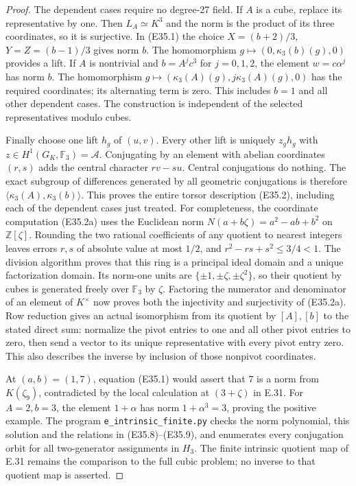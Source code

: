 \begin{proof}
The dependent cases require no degree-27 field.
If $A$ is a cube, replace its representative by one.
Then $L_A\simeq K^3$ and the norm is the product of its
three coordinates, so it is surjective. In (E35.1) the
choice
$X=(b+2)/3$, $Y=Z=(b-1)/3$ gives norm $b$.
The homomorphism $g\mapsto(0,\kappa_3(b)(g),0)$
provides a lift.
If $A$ is nontrivial and $b=A^j c^3$ for $j=0,1,2$,
the element $w=c\alpha^j$ has norm $b$.
The homomorphism
$g\mapsto(\kappa_3(A)(g),j\kappa_3(A)(g),0)$
has the required coordinates; its alternating term is
zero. This includes $b=1$ and all other dependent
cases. The construction is independent of the selected
representatives modulo cubes.

Finally choose one lift $h_g$ of $(u,v)$.
Every other lift is uniquely $z_g h_g$ with
$z\in H^1(G_K,\mathbb F_3)=\mathcal A$.
Conjugating by an element with abelian coordinates
$(r,s)$ adds the central character
$r v-s u$. Central conjugations do nothing.
The exact subgroup of differences generated by all
geometric conjugations is therefore
$\langle\kappa_3(A),\kappa_3(b)\rangle$.
This proves the entire torsor description (E35.2),
including each of the dependent cases just treated.
For completeness, the coordinate computation (E35.2a)
uses the Euclidean norm
$N(a+b\zeta)=a^2-ab+b^2$ on $\mathbb Z[\zeta]$.
Rounding the two rational coefficients of any quotient
to nearest integers leaves errors $r,s$ of absolute
value at most $1/2$, and
$r^2-rs+s^2\leq3/4<1$. The division algorithm proves
that this ring is a principal ideal domain and a unique
factorization domain. Its norm-one units are
$\{\pm1,\pm\zeta,\pm\zeta^2\}$, so their quotient by
cubes is generated freely over $\mathbb F_3$ by $\zeta$.
Factoring the numerator and denominator of an element
of $K^\times$ now proves both the injectivity and
surjectivity of (E35.2a). Row reduction gives an actual
isomorphism from its quotient by $[A],[b]$ to the stated
direct sum: normalize the pivot entries to one and all
other pivot entries to zero, then send a vector to its
unique representative with every pivot entry zero.
This also describes the inverse by inclusion of those
nonpivot coordinates.

At $(a,b)=(1,7)$, equation (E35.1) would assert that
$7$ is a norm from $K(\zeta_9)$, contradicted by the
local calculation at $(3+\zeta)$ in E.31.
For $A=2,b=3$, the element $1+\alpha$ has norm
$1+\alpha^3=3$, proving the positive example.
The program \texttt{e\_intrinsic\_finite.py} checks the
norm polynomial, this solution and the relations in
(E35.8)--(E35.9), and enumerates every conjugation
orbit for all two-generator assignments in $H_3$.
The finite intrinsic quotient map of E.31 remains the
comparison to the full cubic problem; no inverse to
that quotient map is asserted.
\end{proof}
